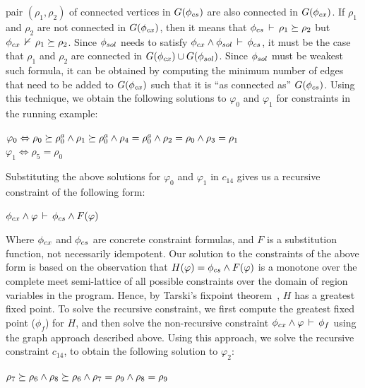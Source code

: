 pair $(\rho_1,\rho_2)$ of connected vertices in $G(\phi_{cs})$ are also
connected in $G(\phi_{cx})$. If $\rho_1$ and $\rho_2$ are not connected
in $G(\phi_{cx})$, then it means that $\phi_{cs}\,\vdash\,\rho_1
\succeq \rho_2$ but $\phi_{cx}\,\nvdash\,\rho_1 \succeq
\rho_2$. Since $\phi_{sol}$ needs to satisfy $\phi_{cx} \wedge
\phi_{sol}\,\vdash\,\phi_{cs}$, it must be the case that $\rho_1$ and $\rho_2$
are connected in $G(\phi_{cx}) \cup G(\phi_{sol})$. Since $\phi_{sol}$ must
be weakest such formula, it can be obtained by computing the minimum
number of edges that need to be added to $G(\phi_{cx})$ such that it is
``as connected as'' $G(\phi_{cs})$. Using this technique, we obtain the
following solutions to $\varphi_0$ and $\varphi_1$ for constraints in
the running example:
\begin{center}
\(
  \varphi_0 \Leftrightarrow \rho_0 \succeq \rho^a_0 \wedge \rho_1
     \succeq \rho^a_0 \wedge \rho_4 = \rho^a_0 \wedge 
     \rho_2 = \rho_0 \wedge \rho_3 = \rho_1
\)\\
\(
  \varphi_1 \Leftrightarrow \rho_5 = \rho_0
\)
\end{center}
Substituting the above solutions for $\varphi_0$ and $\varphi_1$ in
$c_{14}$ gives us a recursive constraint of the following form:
\begin{center}
\(
  \phi_{cx} \wedge \varphi\,\vdash\,\phi_{cs} \wedge F(\varphi)
\)
\end{center}
Where $\phi_{cx}$ and $\phi_{cs}$ are concrete constraint formulas, and $F$ is
a substitution function, not necessarily idempotent. Our solution to the
constraints of the above form is based on the observation that $H(\varphi) =
\phi_{cs} \wedge F(\varphi)$ is a monotone over the complete meet semi-lattice
of all possible constraints over the domain of region variables in the
program. Hence, by Tarski's fixpoint theorem~\cite{tarski}, $H$ has a
greatest fixed point. To solve the recursive constraint, we first compute the
greatest fixed point ($\phi_f$) for $H$, and then solve the non-recursive
constraint $\phi_{cx} \wedge \varphi\,\vdash\,\phi_f$ using the graph
approach described above. Using this approach, we solve the recursive
constraint $c_{14}$, to obtain the following solution to $\varphi_2$:
\begin{center}
\(
  \rho_7 \succeq \rho_6 \wedge \rho_8 \succeq \rho_6 \wedge \rho_7 =
  \rho_9 \wedge \rho_8 = \rho_9
\)
\end{center}


